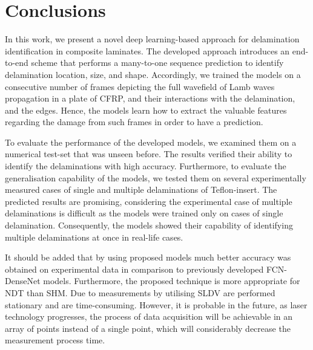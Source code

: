 \section{Conclusions}
\label{conclusion}
In this work, we present a novel deep learning-based approach for delamination identification in composite laminates.
The developed approach introduces an end-to-end scheme that performs a many-to-one sequence prediction to identify delamination location, size, and shape.
Accordingly, we trained the models on a consecutive number of frames depicting the full wavefield of Lamb waves propagation in a plate of CFRP, and their interactions with the delamination, and the edges.
Hence, the models learn how to extract the valuable features regarding the damage from such frames in order to have a prediction.

To evaluate the performance of the developed models, we examined them on a numerical test-set that was unseen before.
The results verified their ability to identify the delaminations with high accuracy. 
Furthermore, to evaluate the generalisation capability of the models, we tested them on several experimentally measured cases of single and multiple delaminations of Teflon-insert.
The predicted results are promising, considering the experimental case of multiple delaminations is difficult as the models were trained only on cases of single delamination.
Consequently, the models showed their capability of identifying multiple delaminations at once in real-life cases.

It should be added that by using proposed models much better accuracy was obtained on experimental data in comparison to previously developed FCN-DenseNet models.
Furthermore, the proposed technique is more appropriate for NDT than SHM.
Due to measurements by utilising SLDV are performed stationary and are time-consuming. 
However, it is probable in the future, as laser technology progresses, the process of data acquisition will be achievable in an array of points instead of a single point, which will considerably decrease the measurement process time.


